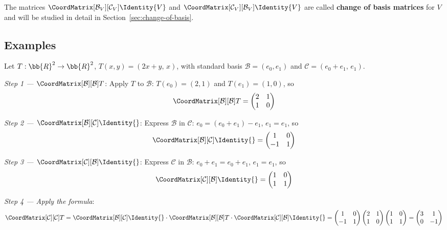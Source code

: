 \begin{remark}
    The matrices $\CoordMatrix[\mathcal{B}_V][\mathcal{C}_V]{\Identity{V}}$ and
    $\CoordMatrix[\mathcal{C}_V][\mathcal{B}_V]{\Identity{V}}$ are called
    \textbf{change of basis matrices} for $V$ and will be studied in detail in
    Section~\ref{sec:change-of-basis}.
\end{remark}

\subsection{Examples}

\begin{example}
\label{ex:cob-endomorphism}
    Let $T: \bb{R}^2 \to \bb{R}^2$, $T(x,y) = (2x + y,\, x)$, with standard basis
    $\mathcal{B} = (e_0, e_1)$ and $\mathcal{C} = (e_0 + e_1,\, e_1)$.

    \textit{Step 1 --- $\CoordMatrix[\mathcal{B}][\mathcal{B}]{T}$}: Apply $T$ to $\mathcal{B}$:
    $T(e_0) = (2,1)$ and $T(e_1) = (1,0)$, so
    \[
        \CoordMatrix[\mathcal{B}][\mathcal{B}]{T}
        = \begin{pmatrix} 2 & 1 \\ 1 & 0 \end{pmatrix}
    \]

    \textit{Step 2 --- $\CoordMatrix[\mathcal{B}][\mathcal{C}]{\Identity{}}$}: Express
    $\mathcal{B}$ in $\mathcal{C}$: $e_0 = (e_0+e_1) - e_1$, $e_1 = e_1$, so
    \[
        \CoordMatrix[\mathcal{B}][\mathcal{C}]{\Identity{}}
        = \begin{pmatrix} 1 & 0 \\ -1 & 1 \end{pmatrix}
    \]

    \textit{Step 3 --- $\CoordMatrix[\mathcal{C}][\mathcal{B}]{\Identity{}}$}: Express
    $\mathcal{C}$ in $\mathcal{B}$: $e_0+e_1 = e_0+e_1$, $e_1 = e_1$, so
    \[
        \CoordMatrix[\mathcal{C}][\mathcal{B}]{\Identity{}}
        = \begin{pmatrix} 1 & 0 \\ 1 & 1 \end{pmatrix}
    \]

    \textit{Step 4 --- Apply the formula}:
    \[
        \CoordMatrix[\mathcal{C}][\mathcal{C}]{T}
        = \CoordMatrix[\mathcal{B}][\mathcal{C}]{\Identity{}}
          \cdot \CoordMatrix[\mathcal{B}][\mathcal{B}]{T}
          \cdot \CoordMatrix[\mathcal{C}][\mathcal{B}]{\Identity{}}
        = \begin{pmatrix} 1 & 0 \\ -1 & 1 \end{pmatrix}
          \begin{pmatrix} 2 & 1 \\ 1 & 0 \end{pmatrix}
          \begin{pmatrix} 1 & 0 \\ 1 & 1 \end{pmatrix}
        = \begin{pmatrix} 3 & 1 \\ 0 & -1 \end{pmatrix}
    \]


\end{example}
